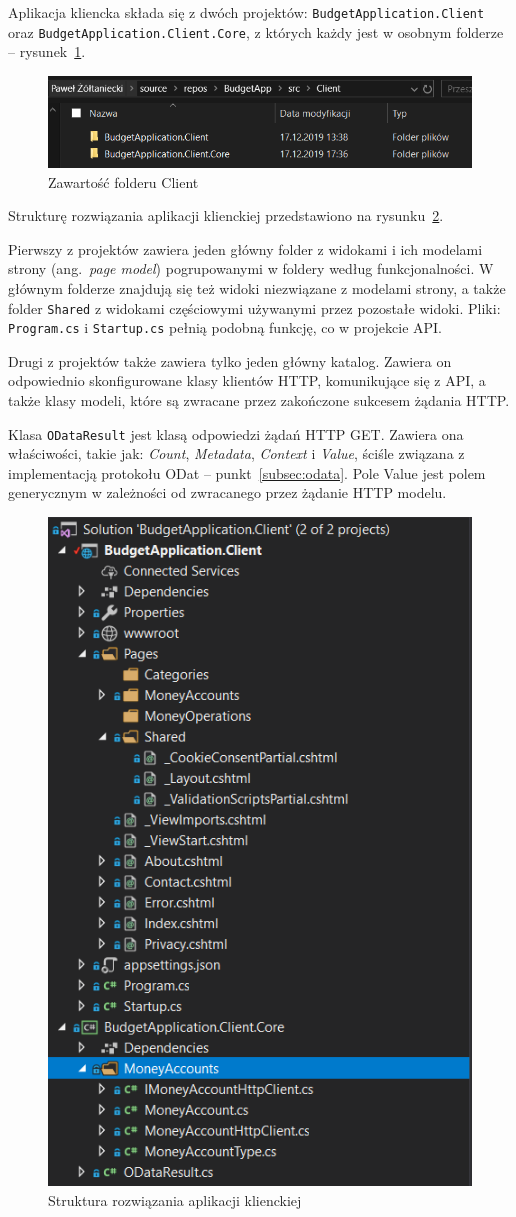 Aplikacja kliencka składa się z dwóch projektów: \texttt{BudgetApplication.Client} oraz \texttt{BudgetApplication.Client.Core}, z których każdy jest w osobnym folderze -- rysunek~\ref{fig:fiz-client-1}. 

\begin{figure}[t]
	\centering
	\includegraphics[width=.7\linewidth]{rys04/struktura-fizyczna-client-1.PNG}
	\caption{Zawartość folderu Client}
	\label{fig:fiz-client-1}
\end{figure}

Strukturę rozwiązania aplikacji klienckiej przedstawiono na rysunku~\ref{fig:fiz-client-2}.

Pierwszy z projektów zawiera jeden główny folder z widokami i ich modelami strony (ang.~\emph{page model}) pogrupowanymi w foldery według funkcjonalności. W głównym folderze znajdują się też widoki niezwiązane z modelami strony, a także folder \texttt{Shared} z widokami częściowymi używanymi przez pozostałe widoki. Pliki: \texttt{Program.cs} i \texttt{Startup.cs} pełnią podobną funkcję, co w projekcie API.

Drugi z projektów także zawiera tylko jeden główny katalog. Zawiera on odpowiednio skonfigurowane klasy klientów HTTP, komunikujące się z API, a także klasy modeli, które są zwracane przez zakończone sukcesem żądania HTTP.

Klasa \texttt{ODataResult} jest klasą odpowiedzi żądań HTTP GET. Zawiera ona właściwości, takie jak: \emph{Count}, \emph{Metadata}, \emph{Context} i \emph{Value}, ściśle związana z implementacją protokołu ODat -- punkt~\ref{subsec:odata}. Pole Value jest polem generycznym w zależności od zwracanego przez żądanie HTTP modelu. 

\begin{figure}[t]
	\centering
	\includegraphics[width=.5\linewidth]{rys04/struktura-fizyczna-client-2.PNG}
	\caption{Struktura rozwiązania aplikacji klienckiej}
	\label{fig:fiz-client-2}
\end{figure}

